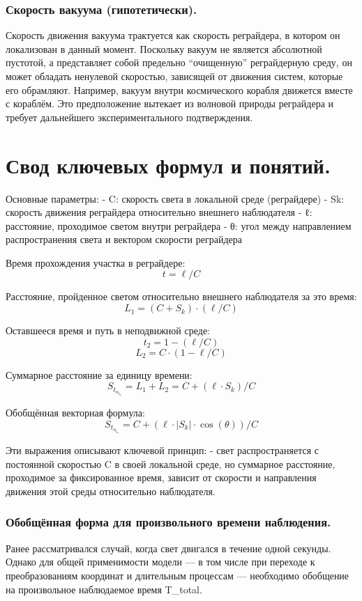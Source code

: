 \documentclass[12pt]{article}
\begin{document}
\subsubsection*{Скорость вакуума (гипотетически).}
Скорость движения вакуума трактуется как скорость реграйдера, в котором он локализован в данный момент. Поскольку вакуум не является абсолютной пустотой, а представляет собой предельно “очищенную” реграйдерную среду, он может обладать ненулевой скоростью, зависящей от движения систем, которые его обрамляют. Например, вакуум внутри космического корабля движется вместе с кораблём. Это предположение вытекает из волновой природы реграйдера и требует дальнейшего экспериментального подтверждения.

\section*{Свод ключевых формул и понятий.}

Основные параметры:
- C: скорость света в локальной среде (реграйдере)
- Sk: скорость движения реграйдера относительно внешнего наблюдателя
- ℓ: расстояние, проходимое светом внутри реграйдера
- θ: угол между направлением распространения света и вектором скорости реграйдера

Время прохождения участка в реграйдере:
\[
t = \ell / C
\]

Расстояние, пройденное светом относительно внешнего наблюдателя за это время:
\[
L_1 = (C + S_k) \cdot (\ell / C)
\]

Оставшееся время и путь в неподвижной среде:
\[
t_2 = 1 - (\ell / C)
\]
\[
L_2 = C \cdot (1 - \ell / C)
\]

Суммарное расстояние за единицу времени:
\[
S_t_o_t_a_l = L_1 + L_2 = C + (\ell \cdot S_k) / C
\]

Обобщённая векторная формула:
\[
S_t_o_t_a_l = C + (\ell \cdot \left|S_k\right| \cdot \cos(\theta)) / C
\]

Эти выражения описывают ключевой принцип:
- свет распространяется с постоянной скоростью C в своей локальной среде, но суммарное расстояние, проходимое за фиксированное время, зависит от скорости и направления движения этой среды относительно наблюдателя.

\subsubsection*{Обобщённая форма для произвольного времени наблюдения.}
Ранее рассматривался случай, когда свет двигался в течение одной секунды. Однако для общей применимости модели — в том числе при переходе к преобразованиям координат и длительным процессам — необходимо обобщение на произвольное наблюдаемое время T_total.
\end{document}
